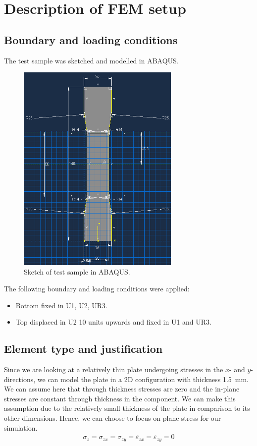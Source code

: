 \documentclass[11pt]{article}
\numberwithin{equation}{section}
\begin{document}
\section{Description of FEM setup}
\subsection{Boundary and loading conditions}
The test sample was sketched and modelled in ABAQUS.
\begin{figure}[H]
    \centering
    \includegraphics[width = 0.7\textwidth]{./img/Sketch1.png}
    \caption{Sketch of test sample in ABAQUS.}
    \label{sampleSketch}
\end{figure} 
The following boundary and loading conditions were applied:
\begin{itemize}
    \item Bottom fixed in U1, U2, UR3.
    \item Top displaced in U2 10 units upwards and fixed in U1 and UR3.
\end{itemize}
\subsection{Element type and justification}
Since we are looking at a relatively thin plate undergoing stresses in the $x$- and $y$- directions, we can model the plate in a 2D configuration with thickness \SI{1.5}{\milli\m}. We can assume here that through thickness stresses are zero and the in-plane stresses are constant through thickness in the component. We can make this assumption due to the relatively small thickness of the plate in comparison to its other dimensions. Hence, we can choose to focus on plane stress for our simulation.
\begin{gather}
    \sigma_z = \sigma_{zx} = \sigma_{zy} = \varepsilon_{zx} = \varepsilon_{zy} = 0
\end{gather}
\end{document}
